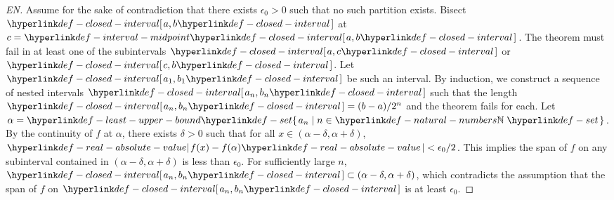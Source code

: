 \begin{proof}[EN]
Assume for the sake of contradiction that there exists $\epsilon_0 > 0$ such that no such partition exists. Bisect $\ClosedInterval{a, b}$ at $c = \IntervalMidpoint{\ClosedInterval{a, b}}$. The theorem must fail in at least one of the subintervals $\ClosedInterval{a, c}$ or $\ClosedInterval{c, b}$. Let $\ClosedInterval{a_1, b_1}$ be such an interval. By induction, we construct a sequence of nested intervals $\ClosedInterval{a_n, b_n}$ such that the length $\ClosedInterval{a_n, b_n} = (b-a)/2^n$ and the theorem fails for each. Let $\alpha = \LeastUpperBound{\Set{a_n \mid n \in \NaturalNumbers}}$. By the continuity of $f$ at $\alpha$, there exists $\delta > 0$ such that for all $x \in (\alpha - \delta, \alpha + \delta)$, $\RealAbsoluteValue{f(x) - f(\alpha)} < \epsilon_0 / 2$. This implies the span of $f$ on any subinterval contained in $(\alpha - \delta, \alpha + \delta)$ is less than $\epsilon_0$. For sufficiently large $n$, $\ClosedInterval{a_n, b_n} \subset (\alpha - \delta, \alpha + \delta)$, which contradicts the assumption that the span of $f$ on $\ClosedInterval{a_n, b_n}$ is at least $\epsilon_0$.
\end{proof}